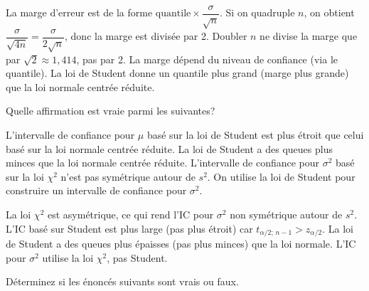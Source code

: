 \begin{questions}
\begin{solution}
La marge d'erreur est de la forme $\text{quantile}\times \dfrac{\sigma}{\sqrt{n}}$. Si on quadruple $n$, on obtient $\dfrac{\sigma}{\sqrt{4n}}=\dfrac{\sigma}{2\sqrt{n}}$, donc la marge est divisée par 2. Doubler $n$ ne divise la marge que par $\sqrt{2}\approx 1{,}414$, pas par 2. La marge dépend du niveau de confiance (via le quantile). La loi de Student donne un quantile plus grand (marge plus grande) que la loi normale centrée réduite.
\end{solution}

\vspace{0.5cm}
\question[4] Quelle affirmation est vraie parmi les suivantes?

\begin{checkboxes}
    \choice L'intervalle de confiance pour $\mu$ basé sur la loi de Student est plus étroit que celui basé sur la loi normale centrée réduite.
    \choice La loi de Student a des queues plus minces que la loi normale centrée réduite.
    \correctchoice L'intervalle de confiance pour $\sigma^2$ basé sur la loi $\chi^2$ n'est pas symétrique autour de $s^2$.
    \choice On utilise la loi de Student pour construire un intervalle de confiance pour $\sigma^2$.
\end{checkboxes}

\begin{solution}
La loi $\chi^2$ est asymétrique, ce qui rend l'IC pour $\sigma^2$ non symétrique autour de $s^2$. L'IC basé sur Student est plus large (pas plus étroit) car $t_{\alpha/2;\,n-1}>z_{\alpha/2}$. La loi de Student a des queues plus épaisses (pas plus minces) que la loi normale. L'IC pour $\sigma^2$ utilise la loi $\chi^2$, pas Student.
\end{solution}

\pageblanche
\question Déterminez si les énoncés suivants sont vrais ou faux.

\end{questions}
